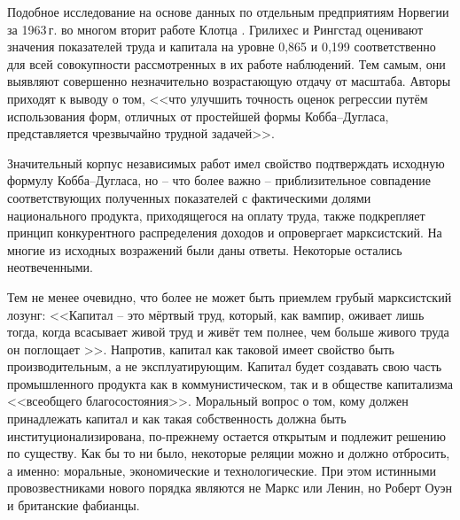 \documentclass{article}
\begin{document}
Подобное исследование на основе данных по отдельным предприятиям Норвегии за 1963\,г. во многом вторит работе Клотца \cite{Griliches:1}. Грилихес и Рингстад оценивают значения показателей труда и капитала на уровне 0,865 и 0,199 соответственно для всей совокупности рассмотренных в их работе наблюдений. Тем самым, они выявляют совершенно незначительно возрастающую отдачу от масштаба. Авторы приходят к выводу о том, <<что улучшить точность оценок регрессии путём использования форм, отличных от простейшей формы Кобба--Дугласа, представляется чрезвычайно трудной задачей>>.

%

Значительный корпус независимых работ имел свойство подтверждать исходную формулу Кобба--Дугласа, но -- что более важно -- приблизительное совпадение соответствующих полученных показателей с фактическими долями национального продукта, приходящегося на оплату труда, также подкрепляет принцип конкурентного распределения доходов и опровергает марксистский. На многие из исходных возражений были даны ответы. Некоторые остались неотвеченными.

Тем не менее очевидно, что более не может быть приемлем грубый марксистский лозунг: <<Капитал -- это мёртвый труд, который, как вампир, оживает лишь тогда, когда всасывает живой труд и живёт тем полнее, чем больше живого труда он поглощает%
>>. Напротив, капитал как таковой имеет свойство быть производительным, а не эксплуатирующим. Капитал будет создавать свою часть промышленного продукта как в коммунистическом, так и в обществе капитализма <<всеобщего благосостояния>>. Моральный вопрос о том, кому должен принадлежать капитал и как такая собственность должна быть институционализирована, по-прежнему остается открытым и подлежит решению по существу. Как бы то ни было, некоторые реляции можно и должно отбросить, а именно: моральные, экономические и технологические. При этом истинными провозвестниками нового порядка являются не Маркс или Ленин, но Роберт Оуэн и британские фабианцы.
\end{document}

